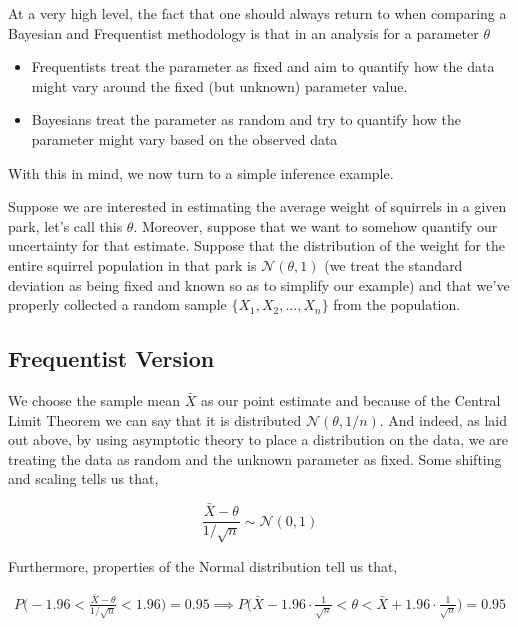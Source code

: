 \documentclass[12pt,twoside]{reedthesis}
\begin{document}
At a very high level, the fact that one should always return to when comparing a Bayesian and Frequentist methodology is that in an analysis for a parameter \(\theta\)
\begin{itemize}
\item
  Frequentists treat the parameter as fixed and aim to quantify how the data might vary around the fixed (but unknown) parameter value.
\item
  Bayesians treat the parameter as random and try to quantify how the parameter might vary based on the observed data
\end{itemize}
With this in mind, we now turn to a simple inference example.

Suppose we are interested in estimating the average weight of squirrels in a given park, let's call this \(\theta\). Moreover, suppose that we want to somehow quantify our uncertainty for that estimate. Suppose that the distribution of the weight for the entire squirrel population in that park is \(\mathcal{N}(\theta, 1)\) (we treat the standard deviation as being fixed and known so as to simplify our example) and that we've properly collected a random sample \(\{X_1, X_2, ..., X_n\}\) from the population.

\hypertarget{frequentist-version}{%
\subsection{Frequentist Version}\label{frequentist-version}}

We choose the sample mean \(\bar{X}\) as our point estimate and because of the Central Limit Theorem we can say that it is distributed \(\mathcal{N}(\theta, 1/n)\). And indeed, as laid out above, by using asymptotic theory to place a distribution on the data, we are treating the data as random and the unknown parameter as fixed. Some shifting and scaling tells us that,

\[
\frac{\bar{X} - \theta}{1/\sqrt{n}} \sim \mathcal{N}(0,1)
\]

Furthermore, properties of the Normal distribution tell us that,

\[
\begin{aligned}
P\bigg(-1.96 < \frac{\bar{X} - \theta}{1/\sqrt{n}} < 1.96\bigg) = 0.95 \implies P\bigg(\bar{X} - 1.96\cdot\frac{1}{\sqrt{n}} < \theta < \bar{X} + 1.96\cdot\frac{1}{\sqrt{n}}\bigg) = 0.95
\end{aligned}
\]
\end{document}
